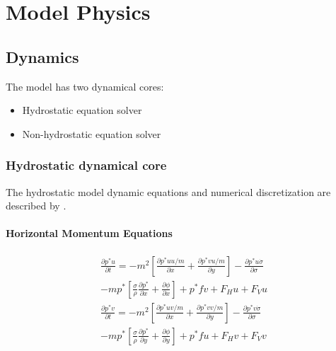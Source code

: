 
\newpage

\chapter{Model Physics}

\section{Dynamics}
The model has two dynamical cores:

\begin{itemize}
\item Hydrostatic equation solver
\item Non-hydrostatic equation solver
\end{itemize}

\subsection{Hydrostatic dynamical core}
The hydrostatic model dynamic equations and numerical discretization are
described by \cite{Grell_94}.

\subsubsection{Horizontal Momentum Equations}

\begin{gather}
\label{hydro1}
	\frac{\partial{p^{\ast}u}}{\partial{t}} =
	-m^2 \left[ \frac{\partial{p^{\ast}uu/m}}{\partial{x}} + 
		\frac{\partial{p^{\ast}vu/m}}{\partial{y}} \right] -
		\frac{\partial{p^{\ast}u \dot{\sigma}}}{\partial{\sigma}}
	    \\ \nonumber
	    -mp^{\ast} \left[ \frac{\sigma}{\rho}
			\frac{\partial{p^{\ast}}}{\partial{x}} +
			\frac{\partial{\phi}}{\partial{x}} \right] +
	p^{\ast}fv + F_Hu + F_Vu \\
\label{hydro2}
	\frac{\partial{p^{\ast}v}}{\partial{t}} = 
	-m^2 \left[ \frac{\partial{p^{\ast}uv/m}}{\partial{x}} +
		\frac{\partial{p^{\ast}vv/m}}{\partial{y}} \right] -
		\frac{\partial{p^{\ast}v\dot{\sigma}}}{\partial{\sigma}}
	   \\ \nonumber
	   -mp^{\ast} \left[ \frac{\sigma}{\rho}
	   		\frac{\partial{p^{\ast}}}{\partial{y}} +
			\frac{\partial{\phi}}{\partial{y}} \right]
	+ p^{\ast}fu + F_Hv + F_Vv
\end{gather}

